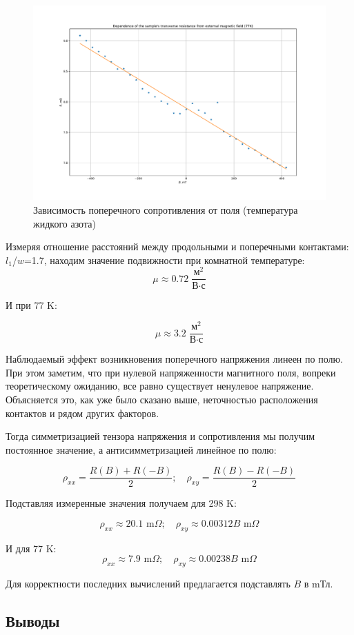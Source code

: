 \documentclass[a4paper, 12pt]{article}
\begin{document}
\begin{figure}[H]
	\centering
	\includegraphics[width=0.8\linewidth]{3_cold.pdf}
	\caption{Зависимость поперечного  сопротивления от поля (температура жидкого азота)}
	\label{fig:3_cold}
\end{figure}

Измеряя отношение расстояний между продольными и поперечными контактами: $l_1$/$w$=1.7, находим значение подвижности при комнатной температуре:
$$\mu\approx 0.72  \; \frac{\text{м}^2}{\text{В} \cdot \text{с}}$$

И при 77 K:

$$\mu\approx 3.2   \; \frac{\text{м}^2}{\text{В} \cdot \text{с}}$$

Наблюдаемый эффект возникновения поперечного напряжения линеен по полю. При этом заметим, что при нулевой напряженности магнитного поля, вопреки теоретическому ожиданию, все равно существует ненулевое напряжение. Объясняется это, как уже было сказано выше, неточностью расположения контактов и рядом других факторов. 

Тогда симметризацией тензора напряжения и сопротивления мы получим постоянное значение, а антисимметризацией линейное по полю:

$$ \rho_{xx}=\frac{R(B)+R(-B)}{2};\quad \rho_{xy}=\frac{R(B)-R(-B)}{2}$$

Подставляя измеренные значения получаем для 298 K:

$$\rho_{xx}\approx 20.1 \text{ m$\Omega$}; \quad \rho_{xy}\approx0.00312B \text{ m$\Omega$}$$

И для 77 K:
$$\rho_{xx}\approx7.9 \text{ m$\Omega$}; \quad \rho_{xy}\approx0.00238B \text{ m$\Omega$}$$

Для корректности последних вычислений предлагается подставлять $B$ в mТл.

\subsection{Выводы}
\end{document}
